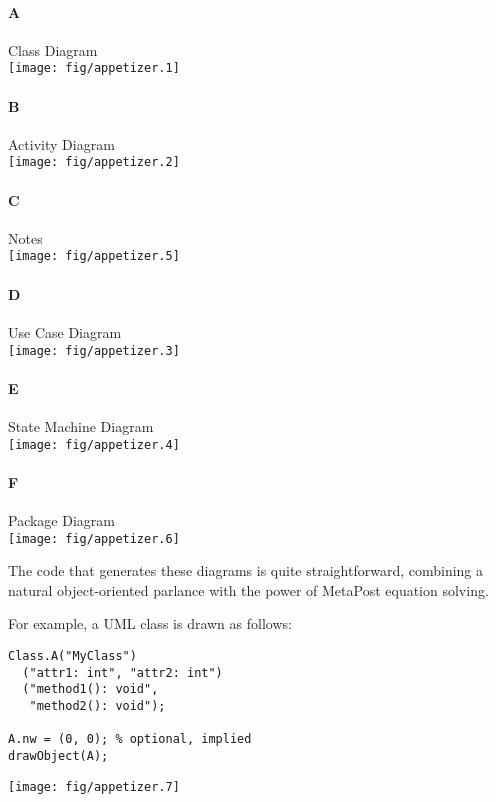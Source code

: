 \documentclass{article}
\begin{document}
\begin{multicols}{2}
\paragraph{A} Class Diagram\\
\texttt{[image: fig/appetizer.1]}
\paragraph{B} Activity Diagram\\
\texttt{[image: fig/appetizer.2]}
\paragraph{C} Notes\\
\texttt{[image: fig/appetizer.5]}
\columnbreak
\paragraph{D} Use Case Diagram\\
\texttt{[image: fig/appetizer.3]}
\paragraph{E} State Machine Diagram\\
\texttt{[image: fig/appetizer.4]}
\paragraph{F} Package Diagram\\
\texttt{[image: fig/appetizer.6]}
\end{multicols}

\pagebreak

The code that generates these diagrams is quite straightforward, combining a natural object-oriented parlance
with the power of MetaPost \cite {metapost} equation solving.

For example, a UML class is drawn as follows:

\begin{multicols}{2}
\begin{verbatim}
Class.A("MyClass")
  ("attr1: int", "attr2: int")
  ("method1(): void",
   "method2(): void");

A.nw = (0, 0); % optional, implied
drawObject(A);
\end{verbatim}
\columnbreak
\hspace{1cm}\texttt{[image: fig/appetizer.7]}
\end{multicols}
\end{document}
